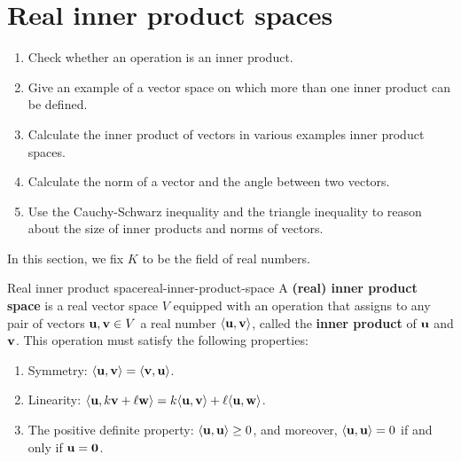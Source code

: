 \section{Real inner product spaces}

\begin{outcome}
  \begin{enumerate}
  \item Check whether an operation is an inner product.
  \item Give an example of a vector space on which more than one inner
    product can be defined.
  \item Calculate the inner product of vectors in various examples
    inner product spaces.
  \item Calculate the norm of a vector and the angle between two vectors.
  \item Use the Cauchy-Schwarz inequality and the triangle inequality
    to reason about the size of inner products and norms of vectors.
  \end{enumerate}
\end{outcome}

In this section, we fix $K$ to be the field of real numbers.

\begin{definition}{Real inner product space}{real-inner-product-space}
  A \textbf{(real) inner product space}%
   is a real vector space $V$ equipped
  with an operation that assigns to any pair of vectors
  $\vect{u},\vect{v}\in V$ a real number $\iprod{\vect{u},\vect{v}}$,
  called the \textbf{inner product}%
   of $\vect{u}$ and
  $\vect{v}$. This operation must satisfy the following properties:
  \begin{enumerate}
  \item Symmetry:%
    $\iprod{\vect{u},\vect{v}} = \iprod{\vect{v},\vect{u}}$.
  \item Linearity:%
    $\iprod{\vect{u},k\vect{v}+\ell\vect{w}}
    = k\iprod{\vect{u},\vect{v}}+\ell\iprod{\vect{u},\vect{w}}$.
  \item The positive definite property:%
    $\iprod{\vect{u},\vect{u}} \geq 0$, and moreover,
    $\iprod{\vect{u},\vect{u}}=0$ if and only if
    $\vect{u} = \vect{0}$.
  \end{enumerate}
\end{definition}

